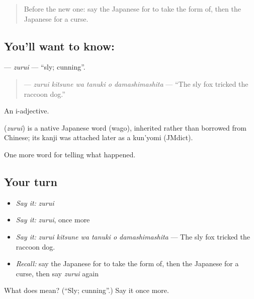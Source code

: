 \label{lesson:JA-C300-zurui}



\begin{quote}
Before the new one: say the Japanese for to take the form of, then the Japanese for a curse.
\end{quote}

\subsection*{You'll want to know: }
\textbf{} — \emph{zurui} — \textquotedblleft{}sly; cunning\textquotedblright{}.

\begin{quote}
\textbf{   } — \emph{zurui kitsune wa tanuki o damashimashita} — \textquotedblleft{}The sly fox tricked the raccoon dog.\textquotedblright{}
\end{quote}

An i-adjective.

\begin{cousinweb}
\textbf{} (\emph{zurui}) is a native Japanese word (wago), inherited rather than borrowed from Chinese; its kanji was attached later as a kun'yomi (JMdict).
\end{cousinweb}

\begin{grammarlens}[title={What you've built}]
One more word for telling what happened.
\end{grammarlens}

\subsection*{Your turn}
\begin{itemize}
\raggedright
  \item \emph{Say it:} \emph{zurui}
  \item \emph{Say it:} \emph{zurui}, once more
  \item \emph{Say it:} \emph{zurui kitsune wa tanuki o damashimashita} — The sly fox tricked the raccoon dog.
  \item \emph{Recall:} say the Japanese for to take the form of, then the Japanese for a curse, then say \emph{zurui} again
\end{itemize}

\begin{tcolorbox}[breakable,colback=teal!4,colframe=teal!35!black,title={Before you move on}]
What does  mean? (\textquotedblleft{}Sly; cunning\textquotedblright{}.) Say it once more.
\end{tcolorbox}
